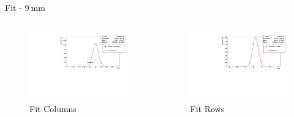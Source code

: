 \begin{frame}{ Fit - $\SI{9}{\milli\meter}$ }
  \begin{columns}

   \begin{column}{0.48\textwidth}
     \begin{figure}
       \centering
       \includegraphics[width=1.05\textwidth]{./9_mm_erorbar_plot_col.pdf}
       \caption{ Fit Columns }
       \label{ fig: iv_curve_theoretical}
     \end{figure}
   \end{column}

   \begin{column}{0.48\textwidth}
     \begin{figure}
       \centering
       \includegraphics[width=1.05\textwidth]{./9_mm_erorbar_plot_row.pdf}
       \caption{ Fit Rows }
       \label{ fig: iv_curve_measured}
     \end{figure}
   \end{column}

  \end{columns}

\end{frame}


